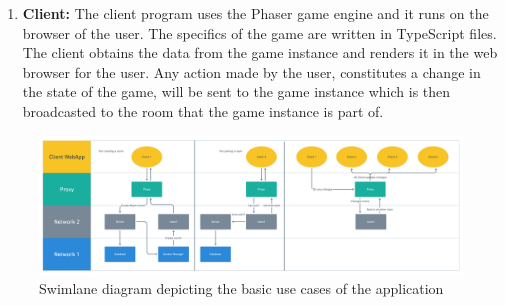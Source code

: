 \documentclass[oneside,12pt]{Classes/VTU}
\begin{document}
\begin{enumerate}
		\item \textbf{Client:} The client program uses the Phaser game engine and it runs on the browser of the user. The specifics of the game are written in TypeScript files. The client obtains the data from the game instance and renders it in the web browser for the user. Any action made by the user, constitutes a change in the state of the game, will be sent to the game instance which is then broadcasted to the room that the game instance is part of. 	
	\end{enumerate}
	
	\begin{figure}[ht!]
		\includegraphics[scale=0.09]{swimlane.png}
		\caption{Swimlane diagram depicting the basic use cases of the application}
		\label{fig:swim}
	\end{figure}
\end{document}
